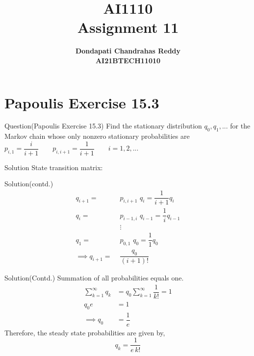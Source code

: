 \documentclass{beamer}
\title{\textbf{AI1110 \\ Assignment 11} }
\author{\textbf{Dondapati Chandrahas Reddy}\\\textbf{AI21BTECH11010}}
\begin{document}
	

\begin{frame}
	\titlepage 
\end{frame}


\section{Papoulis Exercise 15.3}
\begin{frame}{Question(Papoulis Exercise 15.3)}
	Find the stationary distribution $q_0, q_1 ,...$ for the Markov chain whose only nonzero stationary probabilities are\\[1em]
	\hspace{4em} $p_{i,1} = \dfrac{i}{i+1} \hspace{2em} p_{i,i+1} = \dfrac{1}{i+1} \hspace{2em} i = 1,2,...$
\end{frame}

\begin{frame}{Solution}
	State transition matrix:\\
	
\end{frame}

\begin{frame}{Solution(contd.)}
	\begin{align}
		q_{i+1} =\,\, &p_{i,i+1}\,\, q_i = \dfrac{1}{i+1}q_i\\[1ex]
		q_{i} = \,\, &p_{i-1,i}\,\, q_{i-1} = \dfrac{1}{i}q_{i-1}\\
		& \vdots \nonumber\\
		q_{1} = \,\, &p_{0,1}\,\, q_{0} = \dfrac{1}{1}q_{0}\\[1em]
		\implies q_{i+1} =\,\, &\dfrac{q_0}{(i+1)!}
	\end{align}
\end{frame}

\begin{frame}{Solution(Contd.)}
	Summation of all probabilities equals one.
	\begin{align}
		\sum\limits_{k=1}^{\infty} q_k &=  q_0 \sum\limits_{k=1}^{\infty} \dfrac{1}{k!} = 1\\[1ex]
		q_0e &= 1 \\[1ex]
		\implies q_0 &= \dfrac{1}{e}
	\end{align}
	Therefore, the steady state probabilities are given by,\\
	\begin{equation}
		q_k = \dfrac{1}{e\,k!}
	\end{equation}
\end{frame}
\end{document}
